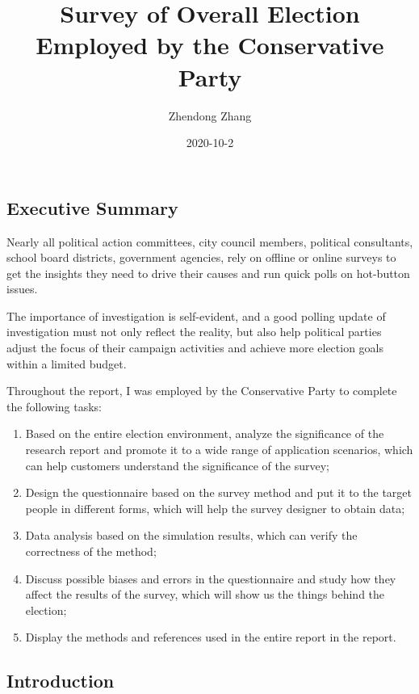 \documentclass[
]{article}
\title{Survey of Overall Election Employed by the Conservative Party}
\author{Zhendong Zhang}
\date{2020-10-2}
\begin{document}
\maketitle

\hypertarget{executive-summary}{%
\subsection{Executive Summary}\label{executive-summary}}

Nearly all political action committees, city council members, political
consultants, school board districts, government agencies, rely on
offline or online surveys to get the insights they need to drive their
causes and run quick polls on hot-button issues.

The importance of investigation is self-evident, and a good polling
update of investigation must not only reflect the reality, but also help
political parties adjust the focus of their campaign activities and
achieve more election goals within a limited budget.

Throughout the report, I was employed by the Conservative Party to
complete the following tasks:

\begin{enumerate}
\def\labelenumi{\arabic{enumi}.}
\item
  Based on the entire election environment, analyze the significance of
  the research report and promote it to a wide range of application
  scenarios, which can help customers understand the significance of the
  survey;
\item
  Design the questionnaire based on the survey method and put it to the
  target people in different forms, which will help the survey designer
  to obtain data;
\item
  Data analysis based on the simulation results, which can verify the
  correctness of the method;
\item
  Discuss possible biases and errors in the questionnaire and study how
  they affect the results of the survey, which will show us the things
  behind the election;
\item
  Display the methods and references used in the entire report in the
  report.
\end{enumerate}

\hypertarget{introduction}{%
\subsection{Introduction}\label{introduction}}
\end{document}
